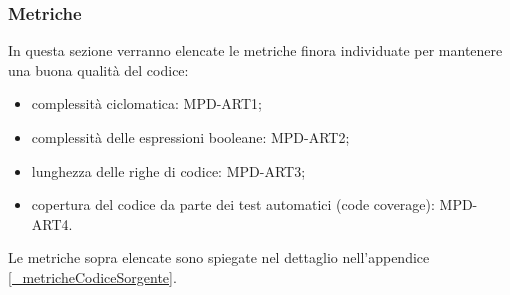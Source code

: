\subsubsection{Metriche}
\label{_metricheQualitaCodice}
In questa sezione verranno elencate le metriche finora individuate per mantenere una buona qualità del codice:
\begin{itemize}
  \item complessità ciclomatica: MPD-ART1;
  \item complessità delle espressioni booleane: MPD-ART2;
  \item lunghezza delle righe di codice: MPD-ART3;
  \item copertura del codice da parte dei test automatici (code coverage): MPD-ART4.
\end{itemize}

Le metriche sopra elencate sono spiegate nel dettaglio nell'appendice \ref{_metricheCodiceSorgente}.
